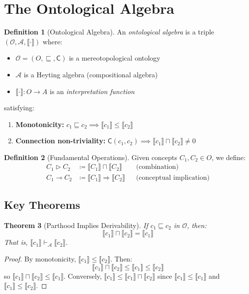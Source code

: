 \documentclass[12pt,a4paper]{article}
\theoremstyle{definition}
\newtheorem{definicao}{Definition}[section]
\theoremstyle{plain}
\newtheorem{teorema}[definicao]{Theorem}
\theoremstyle{remark}
\newcommand{\sem}[1]{\llbracket #1 \rrbracket}
\newcommand{\defeq}{\coloneqq}
\begin{document}
\section{The Ontological Algebra}

\begin{definicao}[Ontological Algebra]
An \emph{ontological algebra} is a triple $(\mathcal{O}, \mathcal{A}, \sem{\cdot})$ where:
\begin{itemize}
    \item $\mathcal{O} = (O, \sqsubseteq, \mathsf{C})$ is a mereotopological ontology
    \item $\mathcal{A}$ is a Heyting algebra (compositional algebra)
    \item $\sem{\cdot} : O \to A$ is an \emph{interpretation function}
\end{itemize}
satisfying:
\begin{enumerate}
    \item \textbf{Monotonicity:} $c_1 \sqsubseteq c_2 \implies \sem{c_1} \leq \sem{c_2}$
    \item \textbf{Connection non-triviality:} $\mathsf{C}(c_1, c_2) \implies \sem{c_1} \sqcap \sem{c_2} \neq 0$
\end{enumerate}
\end{definicao}

\begin{definicao}[Fundamental Operations]
Given concepts $C_1, C_2 \in O$, we define:
\begin{align*}
    C_1 \triangleright C_2 &\defeq \sem{C_1} \sqcap \sem{C_2} && \text{(combination)} \\
    C_1 \multimap C_2 &\defeq \sem{C_1} \Rightarrow \sem{C_2} && \text{(conceptual implication)}
\end{align*}
\end{definicao}

\subsection{Key Theorems}

\begin{teorema}[Parthood Implies Derivability]
If $c_1 \sqsubseteq c_2$ in $\mathcal{O}$, then:
$$
\sem{c_1} \sqcap \sem{c_2} = \sem{c_1}
$$
That is, $\sem{c_1} \vdash_{\mathcal{A}} \sem{c_2}$.
\end{teorema}

\begin{proof}
By monotonicity, $\sem{c_1} \leq \sem{c_2}$. Then:
$$
\sem{c_1} \sqcap \sem{c_2} \leq \sem{c_1} \leq \sem{c_2}
$$
so $\sem{c_1} \sqcap \sem{c_2} \leq \sem{c_1}$. Conversely, $\sem{c_1} \leq \sem{c_1} \sqcap \sem{c_2}$ since $\sem{c_1} \leq \sem{c_1}$ and $\sem{c_1} \leq \sem{c_2}$.
\end{proof}
\end{document}
